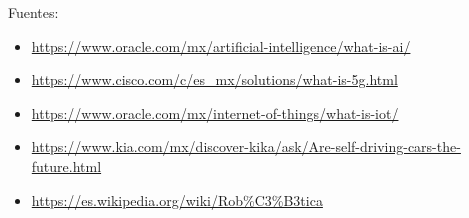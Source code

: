 \documentclass[11pt]{article}
\begin{document}
Fuentes:
\begin{itemize}
\item \url{https://www.oracle.com/mx/artificial-intelligence/what-is-ai/}
\item \url{https://www.cisco.com/c/es\_mx/solutions/what-is-5g.html}
\item \url{https://www.oracle.com/mx/internet-of-things/what-is-iot/}
\item \url{https://www.kia.com/mx/discover-kika/ask/Are-self-driving-cars-the-future.html}
\item \url{https://es.wikipedia.org/wiki/Rob\%C3\%B3tica}
\end{itemize}
\end{document}
